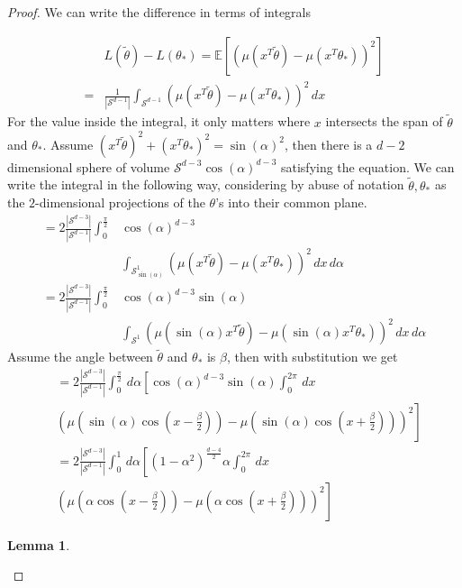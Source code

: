 \documentclass[twoside]{article} \usepackage{aistats2017}
\newcommand{\EV}[1] {
  \mathbb{E}\left[#1\right]}
\newtheorem{lemma}[theorem]{Lemma}
\begin{document}
\begin{proof}
We can write the difference in terms of integrals

\begin{align*}
    &L(\tilde{\theta})-L(\theta_*)=\EV{(\mu(x^T\tilde{\theta})-\mu(x^T\theta_*))^2}\\
    =&\frac{1}{|\mathcal{S}^{d-1}|}\int_{\mathcal{S}^{d-1}}\left(\mu(x^T\tilde{\theta})-\mu(x^T\theta_*)\right)^2\, dx
\end{align*}
For the value inside the integral, it only matters where $x$ intersects the span of $\tilde{\theta}$ and $\theta_*$. Assume $(x^T\tilde{\theta})^2+(x^T\theta_*)^2 = \sin(\alpha)^2$, then there is a $d-2$ dimensional sphere of volume $\mathcal{S}^{d-3}\cos(\alpha)^{d-3}$ satisfying the equation. We can write the integral in the following way, considering by abuse of notation $\tilde{\theta},\theta_*$ as the $2$-dimensional projections of the $\theta$'s into their common plane.
\begin{align*}
    =2\frac{|\mathcal{S}^{d-3}|}{|\mathcal{S}^{d-1}|}\int_{0}^{\frac{\pi}{2}}&\cos(\alpha)^{d-3}\\
    &\int_{\mathcal{S}^1_{\sin(\alpha)}}\left(\mu(x^T\tilde{\theta})-\mu(x^T\theta_*)\right)^2\, dx\,d\alpha\nonumber\\
    =2\frac{|\mathcal{S}^{d-3}|}{|\mathcal{S}^{d-1}|}\int_{0}^{\frac{\pi}{2}}&\cos(\alpha)^{d-3}\sin(\alpha)\nonumber\\
    &\int_{\mathcal{S}^1}\left(\mu(\sin(\alpha)x^T\tilde{\theta})-\mu(\sin(\alpha)x^T\theta_*)\right)^2\, dx\,d\alpha\nonumber
\end{align*}    
    Assume the angle between $\tilde{\theta}$ and $\theta_*$ is $\beta$, then with substitution we get
    \begin{align}
        &=2\frac{|\mathcal{S}^{d-3}|}{|\mathcal{S}^{d-1}|}\int_{0}^{\frac{\pi}{2}}\,d\alpha\left[\cos(\alpha)^{d-3}\sin(\alpha)\int_{0}^{2\pi}\, dx\right.\nonumber\\
    &\left.\left(\mu(\sin(\alpha)\cos(x-\frac{\beta}{2}))-\mu(\sin(\alpha)\cos(x+\frac{\beta}{2}))\right)^2\right]\nonumber\\
        &=2\frac{|\mathcal{S}^{d-3}|}{|\mathcal{S}^{d-1}|}\int_{0}^{1}\,d\alpha\left[(1-\alpha^2)^{\frac{d-4}{2}}\alpha\int_{0}^{2\pi}\, dx\right.\nonumber\\
    &\left.\left(\mu(\alpha\cos(x-\frac{\beta}{2}))-\mu(\alpha \cos(x+\frac{\beta}{2}))\right)^2\right]\label{dbound}
    \end{align}
    \begin{lemma}

\end{lemma}
\end{proof}
\end{document}
